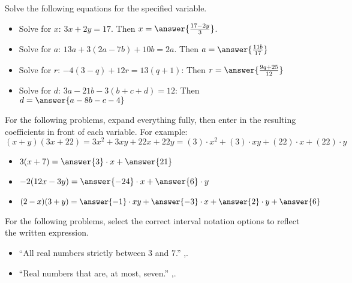 \documentclass{ximera}
\begin{document}
\begin{problem}%
    Solve the following equations for the specified variable.
    \begin{itemize}
        \item Solve for $x$: $3x + 2y = 17$. Then $x = \answer{\frac{17-2y}{3}}$.
        \item Solve for $a$: $13a + 3(2a - 7b) + 10b = 2a$. Then $a = \answer{\frac{11b}{17}}$
        \item Solve for $r$: $-4(3 - q) + 12r = 13(q + 1)$: Then $r = \answer{\frac{9q+25}{12}}$ 
        \item Solve for $d$: $3a - 21b - 3(b + c + d) = 12$: Then $d = \answer{a - 8b-c-4}$
    \end{itemize}
\end{problem}

\begin{problem}%
    For the following problems, expand everything fully, then enter in the resulting coefficients in front of each variable. For example:
    \[
        (x + y)(3x + 22) = 3x^2 + 3xy + 22x + 22y = (3) \cdot x^2 + (3) \cdot xy + (22) \cdot x + (22) \cdot y
    \]
    
    \begin{itemize}
        \item $3(x + 7) = \answer{3} \cdot x + \answer{21}$
        \item $-2(12x - 3y) = \answer{-24}\cdot x + \answer{6}\cdot y$
        \item $(2 - x)(3 + y) = \answer{-1}\cdot xy + \answer{-3}\cdot x + \answer{2} \cdot y + \answer{6}$
    \end{itemize}
\end{problem}

\begin{problem}%
    For the following problems, select the correct interval notation options to reflect the written expression.
    \begin{itemize}
        \item ``All real numbers strictly between $3$ and $7$.'' \wordChoice{\choice[correct]{$(3$}\choice{$[3$}\choice{$(7$}\choice{$[7$}},\wordChoice{\choice{$3)$}\choice{$3]$}\choice[correct]{$7)$}\choice{$7]$}}.
        \item ``Real numbers that are, at most, seven.''
        \wordChoice{\choice[correct]{$(-\infty$}\choice{$[-\infty$}\choice{$(\infty$}\choice{$[\infty$}\choice{$(7$}\choice{$[7$}\choice{$(-7$}\choice{$[-7$}},\wordChoice{\choice{$-\infty)$}\choice{$-\infty]$}\choice{$\infty)$}\choice{$\infty]$}\choice{$7)$}\choice[correct]{$7]$}\choice{$-7)$}\choice{$-7]$}}.
    \end{itemize}
\end{problem}
\end{document}
